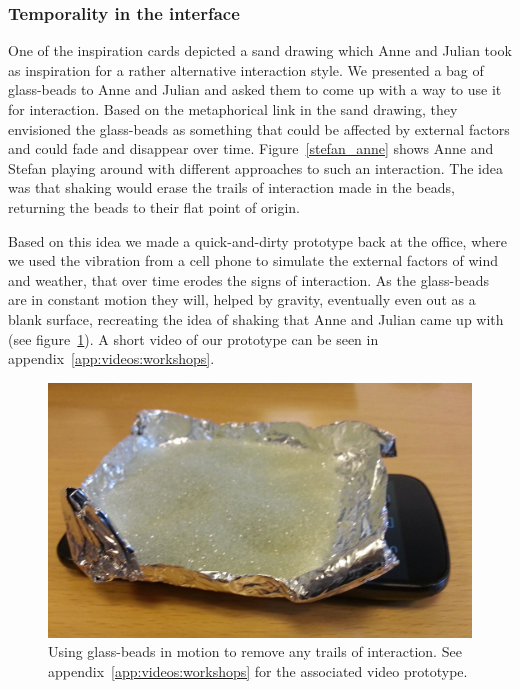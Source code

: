 \subsubsection{Temporality in the interface}

One of the inspiration cards depicted a sand drawing which Anne and Julian took as inspiration for a rather alternative interaction style.
We presented a bag of glass-beads to Anne and Julian and asked them to come up with a way to use it for interaction.
Based on the metaphorical link in the sand drawing, they envisioned the glass-beads as something that could be affected by external factors and could fade and disappear over time.
Figure~\ref{stefan_anne} shows Anne and Stefan playing around with different approaches to such an interaction.
The idea was that shaking would erase the trails of interaction made in the beads, returning the beads to their flat point of origin. 

Based on this idea we made a quick-and-dirty prototype back at the office, where we used the vibration from a cell phone to simulate the external factors of wind and weather, that over time erodes the signs of interaction.
As the glass-beads are in constant motion they will, helped by gravity, eventually even out as a blank surface, recreating the idea of shaking that Anne and Julian came up with (see figure~\ref{fig:ch:workshops:sandinteraction}).
A short video of our prototype can be seen in appendix~\ref{app:videos:workshops}.



\begin{figure}[h]
  \centering
  \begin{minipage}[b]{.8\textwidth}
    \centering
    \includegraphics[width=.7\linewidth]{figures/sandinteraction.jpg}
    \caption{Using glass-beads in motion to remove any trails of interaction. See appendix~\ref{app:videos:workshops} for the associated video prototype.}
    \label{fig:ch:workshops:sandinteraction}
    \end{minipage}
\end{figure}

